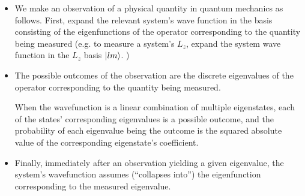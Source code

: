 \documentclass[11pt, a4paper]{article}
\begin{document}
\begin{itemize}
	\item We make an observation of a physical quantity in quantum mechanics as follows. First, expand the relevant system's wave function in the basis consisting of the eigenfunctions of the operator corresponding to the quantity being measured (e.g. to measure a system's $ L_{z} $, expand the system wave function in the $ L_{z} $ basis $ \ket{lm} $. ) 
	
	\item The possible outcomes of the observation are the discrete eigenvalues of the operator corresponding to the quantity being measured. 
	
	When the wavefunction is a linear combination of multiple eigenstates, each of the states' corresponding eigenvalues is a possible outcome, and the probability of each eigenvalue being the outcome is the squared absolute value of the corresponding eigenstate's coefficient.
	
	\item Finally, immediately after an observation yielding a given eigenvalue, the system's wavefunction assumes (``collapses into'') the eigenfunction corresponding to the measured eigenvalue.
\end{itemize}
\end{document}
